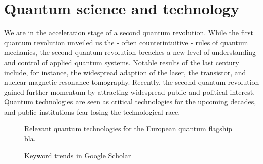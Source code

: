 \section{Quantum science and technology}

We are in the acceleration stage of a second quantum revolution.
While the first quantum revolution unveiled us the - often counterintuitive - rules of quantum mechanics, the second quantum revolution breaches a new level of understanding and control of applied quantum systems.
Notable results of the last century include, for instance, the widespread adaption of the laser, the transistor, and nuclear-magnetic-resonance tomography.
Recently, the second quantum revolution gained further momentum by attracting widespread public and political interest.
Quantum technologies are seen as critical technologies for the upcoming decades, and public institutions fear losing the technological race.



\begin{figure}[htb]
	\centering
	
	\caption{Relevant quantum technologies for the European quantum flagship bla.}
\end{figure}

\begin{figure}[htb]
	\centering
	
	\caption{Keyword trends in Google Scholar}
\end{figure}


